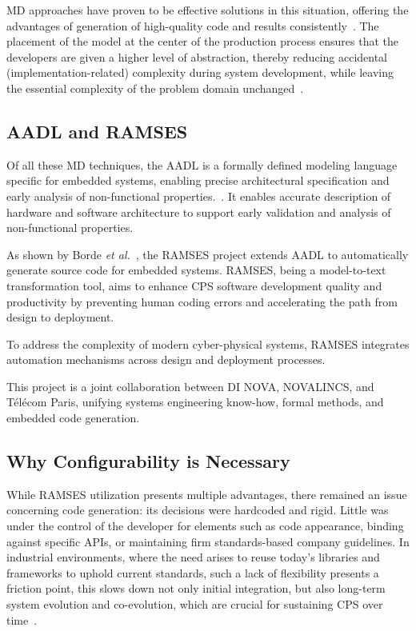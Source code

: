 \gls{MD} approaches have proven to be effective solutions in this situation, offering the advantages of generation of high-quality code and results consistently~\cite{Schmidt_DC_2006}. The placement of the model at the center of the production process ensures that the developers are given a higher level of abstraction, thereby reducing accidental (implementation-related) complexity during system development, while leaving the essential complexity of the problem domain unchanged~\cite{brooks1987no}.

\subsection{AADL and RAMSES}

Of all these \gls{MD} techniques, the \gls{AADL} is a formally defined modeling language specific for embedded systems, enabling precise architectural specification and early analysis of non-functional properties.~\cite{Feiler_Lewis_Vestal_2006}. It enables accurate description of hardware and software architecture to support early validation and analysis of non-functional properties.

As shown by Borde \textit{et al.}~\cite{Borde_Rahmoun_Cadoret_Pautet_Singhoff_Dissaux_2014}, the \gls{RAMSES} project extends \gls{AADL} to automatically generate source code for embedded systems. \gls{RAMSES}, being a model-to-text transformation tool, aims to enhance \gls{CPS} software development quality and productivity by preventing human coding errors and accelerating the path from design to deployment.

\begin{tcolorbox}[colback=green!8]
	To address the complexity of modern cyber-physical systems, \gls{RAMSES} integrates automation mechanisms across design and deployment processes.
\end{tcolorbox}

This project is a joint collaboration between \gls{DI} NOVA, NOVALINCS, and Télécom Paris, unifying systems engineering know-how, formal methods, and embedded code generation.


\subsection{Why Configurability is Necessary}

While \gls{RAMSES} utilization presents multiple advantages, there remained an issue concerning code generation: its decisions were hardcoded and rigid. Little was under the control of the developer for elements such as code appearance, binding against specific APIs, or maintaining firm standards-based company guidelines. In industrial environments, where the need arises to reuse today's libraries and frameworks to uphold current standards, such a lack of flexibility presents a friction point, this slows down not only initial integration, but also long-term system evolution and co-evolution, which are crucial for sustaining \gls{CPS} over time~\cite{Czarnecki_Helsen_2006}.

